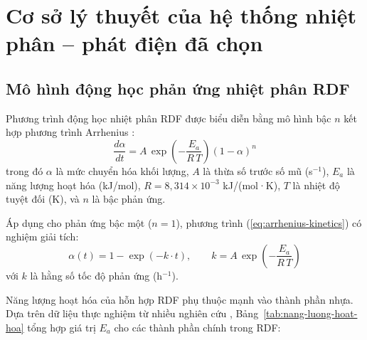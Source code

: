 \documentclass[../main.tex]{subfiles}
\begin{document}
\section{Cơ sở lý thuyết của hệ thống nhiệt phân -- phát điện đã chọn}
\label{sec:co-so-ly-thuyet}

\subsection{Mô hình động học phản ứng nhiệt phân RDF}
\label{sec:dong-hoc-nhiet-phan}

Phương trình động học nhiệt phân RDF được biểu diễn bằng mô hình bậc $n$ kết hợp phương trình Arrhenius \cite{Arena2012,Di_Blasi2008}:
\begin{equation}
  \frac{d\alpha}{dt} = A \, \exp\!\left(-\frac{E_a}{R \, T}\right) \left(1 - \alpha\right)^n
  \label{eq:arrhenius-kinetics}
\end{equation}
trong đó $\alpha$ là mức chuyển hóa khối lượng, $A$ là thừa số trước số mũ (s$^{-1}$), $E_a$ là năng lượng hoạt hóa (kJ/mol), $R = 8{,}314 \times 10^{-3}$ kJ/(mol·K), $T$ là nhiệt độ tuyệt đối (K), và $n$ là bậc phản ứng.

Áp dụng cho phản ứng bậc một ($n = 1$), phương trình (\ref{eq:arrhenius-kinetics}) có nghiệm giải tích:
\begin{equation}
  \alpha(t) = 1 - \exp(-k \cdot t), \qquad k = A \, \exp\!\left(-\frac{E_a}{R \, T}\right)
  \label{eq:first-order-conversion}
\end{equation}
với $k$ là hằng số tốc độ phản ứng (h$^{-1}$).

Năng lượng hoạt hóa của hỗn hợp RDF phụ thuộc mạnh vào thành phần nhựa. Dựa trên dữ liệu thực nghiệm từ nhiều nghiên cứu \cite{Sharuddin2016,Miandad2016,Williams2007}, Bảng~\ref{tab:nang-luong-hoat-hoa} tổng hợp giá trị $E_a$ cho các thành phần chính trong RDF:
\begin{table}[htbp]
\centering
\caption{Năng lượng hoạt hóa và thừa số Arrhenius của các thành phần trong RDF}
\label{tab:nang-luong-hoat-hoa}
\setlength{\tabcolsep}{4pt}
\end{table}
\end{document}
